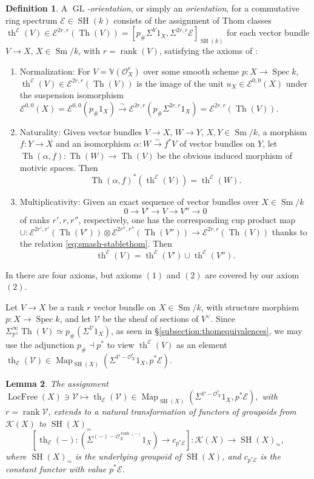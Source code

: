 \documentclass[10pt]{amsart}
\theoremstyle{definition}
\newtheorem{defn}{Definition}[section]
\theoremstyle{plain}
\newtheorem{lemma}[defn]{Lemma}
\numberwithin{equation}{section}
\newcommand{\0}{\emptyset}
\newcommand{\sE}{{\mathcal E}}
\newcommand{\sK}{{\mathcal K}}
\newcommand{\sO}{{\mathcal O}}
\newcommand{\sV}{{\mathcal V}}
\renewcommand{\P}{{\mathbb P}}
\newcommand{\V}{{\mathbb V}}
\newcommand{\GL}{{\operatorname{GL}}}
\newcommand{\Spec}{{\operatorname{Spec}}}
\newcommand{\SH}{{\operatorname{SH}}}
\newcommand{\Th}{{\operatorname{Th}}}
\newcommand{\Sm}{{\operatorname{Sm}}}
\newcommand{\Map}{{\operatorname{Map}}}
\renewcommand{\th}{{\operatorname{th}}}
\newcommand{\rnk}{{\operatorname{rank}}}
\newcommand{\Locfree}{{\operatorname{LocFree}}}
\begin{document}
\begin{defn}
\label{defn:thomclasstheory}
A \emph{$\GL$-orientation}, or simply an \emph{orientation}, for a commutative ring spectrum $\sE\in \SH(k)$ consists of the assignment of Thom classes $\th^\sE(V)\in\sE^{2r,r}(\Th(V))=[p_\#\Sigma^V1_X,\Sigma^{2r,r}\sE]_{\SH(k)}$ for each vector bundle $V\to X$, $X\in \Sm/k$, with $r=\rnk(V)$, satisfying the axioms of \cite[Definition 3.3]{Ana:Slor}: 
\begin{equation}\label{enum:ThomClassAxioms}
\end{equation}
\begin{enumerate} 
\item Normalization: For $V=\V(\sO_X^r)$ over some smooth scheme $p:X \to \Spec k$, $\th^\sE(V)\in \sE^{2r, r}(\Th(V))$ is the image of the unit $u_X\in \sE^{0,0}(X)$ under the suspension isomorphism $\sE^{0,0}(X) = \sE^{0,0}(p_\#1_X)  \xrightarrow{\sim} \sE^{2r, r}(p_\#\Sigma^{2r,r}1_X) = \sE^{2r, r}(\Th(V))$. 
\item Naturality: Given vector bundles $V\to X$, $W\to Y$, $X,Y\in \Sm/k$, a morphism $f:Y\to X$ and an isomorphism $\alpha:W\xrightarrow{\sim} f^*V$ of vector bundles on $Y$, let $\Th(\alpha,f): \Th(W)\to \Th(V)$ be the obvious induced morphism of motivic spaces. Then
$$\Th(\alpha,f)^*(\th^\sE(V))=\th^\sE(W).$$ 
\item Multiplicativity: Given an exact sequence of vector bundles over $X\in \Sm/k$
\[
0\to V'\to V\to V''\to0
\]
of ranks $r', r,r''$, respectively, one has the corresponding cup product map $\cup:\sE^{2r', r'}(\Th(V'))\otimes \sE^{2r'', r''}(\Th(V''))\to \sE^{2r, r}(\Th(V))$ thanks to the relation \eqref{eq:smash-stablethom}. Then
\[
\th^\sE(V)=\th^\sE(V')\cup\th^\sE(V'').
\]
\end{enumerate}
\end{defn}

In \cite[Definition 3.3]{Ana:Slor} there are four axioms, but axioms $(1)$ and $(2)$ are covered by our axiom $(2)$.

Let $V\to X$ be a rank $r$ vector bundle on $X\in \Sm/k$, with structure morphism $p:X\to \Spec k$, and let $\sV$ be the sheaf of sections of $V^\vee$. Since $\Sigma_{\P^1}^\infty \Th(V) \simeq p_\#(\Sigma^\sV1_X)$, as seen in \S \ref{subsection:thomequivalences}, we may use the adjunction $p_\#\dashv p^*$ to view $\th^\sE(V)$ as an element $\th_\sE(\sV)\in \Map_{\SH(X)}(\Sigma^{\sV-\sO_X^r}1_X, p^*\sE)$.

\begin{lemma}
\label{lemma:ThomClassNaturalTransformation}
    The assignment $\Locfree(X) \ni \sV\mapsto \th_\sE(\sV) \in \Map_{\SH(X)}(\Sigma^{\sV-\sO_X^r}1_X, p^*\sE),$ with $r=\rnk \sV$, extends to a natural transformation of functors of groupoids from $\sK(X)$ to $\SH(X)_\simeq$
$$
[\th_\sE(-):(\Sigma^{(-)-\sO_X^{\rnk(-)}}1_X)\to c_{p^*\sE}]:\sK(X)\to \SH(X)_\simeq,
$$
where $\SH(X)_\simeq$ is the underlying groupoid of $\SH(X)$, and $c_{p^*\sE}$ is the constant functor with value $p^*\sE$.
\end{lemma}
\end{document}
